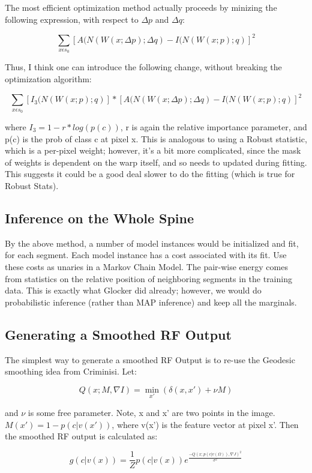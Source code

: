 \documentclass[10pt,twocolumn,letterpaper]{article}
\begin{document}
The most efficient optimization method actually proceeds by minizing the following expression, with respect to $\Delta p$ and $\Delta q$:

\[ \sum_{x \epsilon s_0} [A(N(W(x;\Delta p);\Delta q) - I(N(W(x;p);q)]^2 \]

Thus, I think one can introduce the following change, without breaking the optimization algorithm:

\[ \sum_{x \epsilon s_0} [I_3(N(W(x;p);q)]*[A(N(W(x;\Delta p);\Delta q) - I(N(W(x;p);q)]^2 \]

where $I_3 = 1 - r*log(p(c))$, r is again the relative importance parameter, and p(c) is the prob of class c at pixel x.  This is analogous to using a Robust statistic, which is a per-pixel weight; however, it's a bit more complicated, since the mask of weights is dependent on the warp itself, and so needs to updated during fitting.  This suggests it could be a good deal slower to do the fitting (which is true for Robust Stats).

\subsection{Inference on the Whole Spine}

By the above method, a number of model instances would be initialized and fit, for each segment.  Each model instance has a cost associated with its fit.  Use these costs as unaries in a Markov Chain Model.  The pair-wise energy comes from statistics on the relative position of neighboring segments in the training data.  This is exactly what Glocker did already; however, we would do probabilistic inference (rather than MAP inference) and keep all the marginals.

\subsection{Generating a Smoothed RF Output}

The simplest way to generate a smoothed RF Output is to re-use the Geodesic smoothing idea from Criminisi.  Let:

\[ Q(x; M, \nabla I) = \min_{x'} (\delta (x,x') + \nu M) \]

and $\nu$ is some free parameter.  Note, x and x' are two points in the image. $M(x') = 1 - p(c|v(x'))$, where v(x') is the feature vector at pixel x'.  Then the smoothed RF output is calculated as:

\[ g(c|v(x)) = \frac{1}{Z} p(c|v(x)) e^{\frac{-Q(x;p(c|v(\Omega)),\nabla J)^2}{\sigma ^2}} \]
\end{document}
